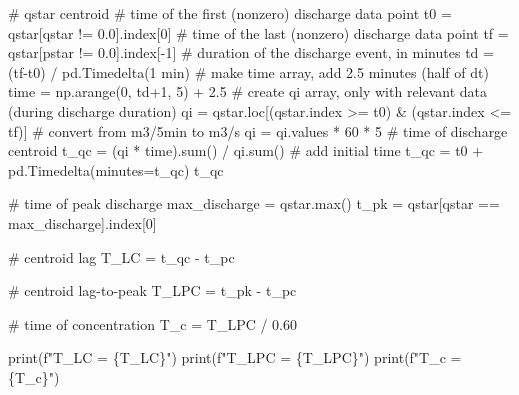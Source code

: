 \documentclass[
  letterpaper,
  DIV=11,
  numbers=noendperiod]{scrreprt}
\newenvironment{Shaded}{\begin{snugshade}}{\end{snugshade}}
\newcommand{\BuiltInTok}[1]{\textcolor[rgb]{0.00,0.23,0.31}{#1}}
\newcommand{\CommentTok}[1]{\textcolor[rgb]{0.37,0.37,0.37}{#1}}
\newcommand{\DecValTok}[1]{\textcolor[rgb]{0.68,0.00,0.00}{#1}}
\newcommand{\FloatTok}[1]{\textcolor[rgb]{0.68,0.00,0.00}{#1}}
\newcommand{\NormalTok}[1]{\textcolor[rgb]{0.00,0.23,0.31}{#1}}
\newcommand{\OperatorTok}[1]{\textcolor[rgb]{0.37,0.37,0.37}{#1}}
\newcommand{\SpecialCharTok}[1]{\textcolor[rgb]{0.37,0.37,0.37}{#1}}
\newcommand{\SpecialStringTok}[1]{\textcolor[rgb]{0.13,0.47,0.30}{#1}}
\newcommand{\StringTok}[1]{\textcolor[rgb]{0.13,0.47,0.30}{#1}}
\begin{document}
\begin{Shaded}
\begin{Highlighting}[]
\CommentTok{\# qstar centroid}
\CommentTok{\# time of the first (nonzero) discharge data point}
\NormalTok{t0 }\OperatorTok{=}\NormalTok{ qstar[qstar }\OperatorTok{!=} \FloatTok{0.0}\NormalTok{].index[}\DecValTok{0}\NormalTok{]}
\CommentTok{\# time of the last (nonzero) discharge data point}
\NormalTok{tf }\OperatorTok{=}\NormalTok{ qstar[pstar }\OperatorTok{!=} \FloatTok{0.0}\NormalTok{].index[}\OperatorTok{{-}}\DecValTok{1}\NormalTok{]}
\CommentTok{\# duration of the discharge event, in minutes}
\NormalTok{td }\OperatorTok{=}\NormalTok{ (tf}\OperatorTok{{-}}\NormalTok{t0) }\OperatorTok{/}\NormalTok{ pd.Timedelta(}\StringTok{\textquotesingle{}1 min\textquotesingle{}}\NormalTok{)}
\CommentTok{\# make time array, add 2.5 minutes (half of dt)}
\NormalTok{time }\OperatorTok{=}\NormalTok{ np.arange(}\DecValTok{0}\NormalTok{, td}\OperatorTok{+}\DecValTok{1}\NormalTok{, }\DecValTok{5}\NormalTok{) }\OperatorTok{+} \FloatTok{2.5}
\CommentTok{\# create qi array, only with relevant data (during discharge duration)}
\NormalTok{qi }\OperatorTok{=}\NormalTok{ qstar.loc[(qstar.index }\OperatorTok{\textgreater{}=}\NormalTok{ t0) }\OperatorTok{\&}\NormalTok{ (qstar.index }\OperatorTok{\textless{}=}\NormalTok{ tf)]}
\CommentTok{\# convert from m3/5min to m3/s}
\NormalTok{qi }\OperatorTok{=}\NormalTok{ qi.values }\OperatorTok{*} \DecValTok{60} \OperatorTok{*} \DecValTok{5}
\CommentTok{\# time of discharge centroid}
\NormalTok{t\_qc }\OperatorTok{=}\NormalTok{ (qi }\OperatorTok{*}\NormalTok{ time).}\BuiltInTok{sum}\NormalTok{() }\OperatorTok{/}\NormalTok{ qi.}\BuiltInTok{sum}\NormalTok{()}
\CommentTok{\# add initial time}
\NormalTok{t\_qc }\OperatorTok{=}\NormalTok{ t0 }\OperatorTok{+}\NormalTok{ pd.Timedelta(minutes}\OperatorTok{=}\NormalTok{t\_qc)}
\NormalTok{t\_qc}

\CommentTok{\# time of peak discharge}
\NormalTok{max\_discharge }\OperatorTok{=}\NormalTok{ qstar.}\BuiltInTok{max}\NormalTok{()}
\NormalTok{t\_pk }\OperatorTok{=}\NormalTok{ qstar[qstar }\OperatorTok{==}\NormalTok{ max\_discharge].index[}\DecValTok{0}\NormalTok{]}

\CommentTok{\# centroid lag}
\NormalTok{T\_LC }\OperatorTok{=}\NormalTok{ t\_qc }\OperatorTok{{-}}\NormalTok{ t\_pc}

\CommentTok{\# centroid lag{-}to{-}peak}
\NormalTok{T\_LPC }\OperatorTok{=}\NormalTok{ t\_pk }\OperatorTok{{-}}\NormalTok{ t\_pc}

\CommentTok{\# time of concentration}
\NormalTok{T\_c }\OperatorTok{=}\NormalTok{ T\_LPC }\OperatorTok{/} \FloatTok{0.60}

\BuiltInTok{print}\NormalTok{(}\SpecialStringTok{f"T\_LC = }\SpecialCharTok{\{}\NormalTok{T\_LC}\SpecialCharTok{\}}\SpecialStringTok{"}\NormalTok{)}
\BuiltInTok{print}\NormalTok{(}\SpecialStringTok{f"T\_LPC = }\SpecialCharTok{\{}\NormalTok{T\_LPC}\SpecialCharTok{\}}\SpecialStringTok{"}\NormalTok{)}
\BuiltInTok{print}\NormalTok{(}\SpecialStringTok{f"T\_c = }\SpecialCharTok{\{}\NormalTok{T\_c}\SpecialCharTok{\}}\SpecialStringTok{"}\NormalTok{)}
\end{Highlighting}
\end{Shaded}
\end{document}

